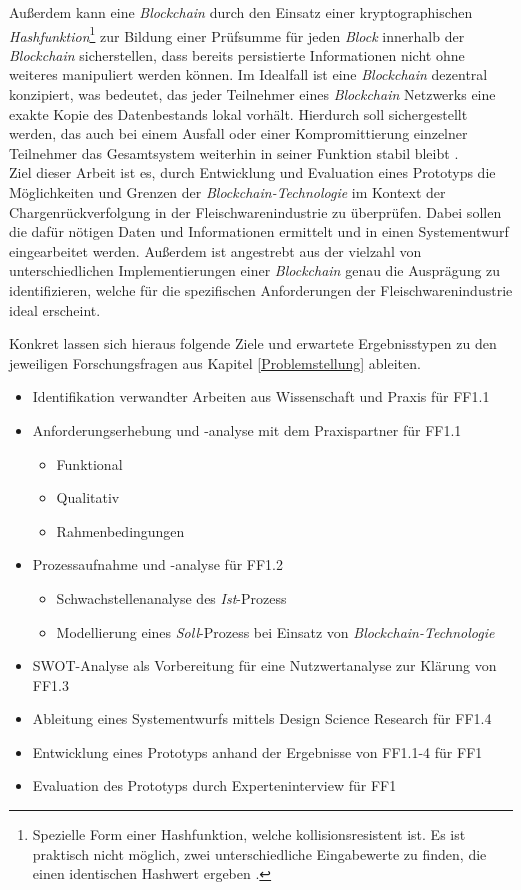 Außerdem kann eine \textit{Blockchain} durch den Einsatz einer kryptographischen \textit{Hashfunktion}\footnote{Spezielle Form einer Hashfunktion, welche kollisionsresistent ist. Es ist praktisch nicht möglich, zwei unterschiedliche Eingabewerte zu finden, die einen identischen Hashwert ergeben \citep{Menezes1997}.} zur Bildung einer Prüfsumme für jeden \textit{Block} innerhalb der \textit{Blockchain} sicherstellen, dass bereits persistierte Informationen nicht ohne weiteres manipuliert werden können. Im Idealfall ist eine \textit{Blockchain} dezentral konzipiert, was bedeutet, das jeder Teilnehmer eines \textit{Blockchain} Netzwerks eine exakte Kopie des Datenbestands lokal vorhält. Hierdurch soll sichergestellt werden, das auch bei einem Ausfall oder einer Kompromittierung einzelner Teilnehmer das Gesamtsystem weiterhin in seiner Funktion stabil bleibt \citep{Drescher2017, Tribis2018}.\\

Ziel dieser Arbeit ist es, durch Entwicklung und Evaluation eines Prototyps die Möglichkeiten und Grenzen der \textit{Blockchain-Technologie} im Kontext der Chargenrückverfolgung in der Fleischwarenindustrie zu überprüfen. Dabei sollen die dafür nötigen Daten und Informationen ermittelt und in einen Systementwurf eingearbeitet werden. Außerdem ist angestrebt aus der vielzahl von unterschiedlichen Implementierungen einer \textit{Blockchain} genau die Ausprägung zu identifizieren, welche für die spezifischen Anforderungen der Fleischwarenindustrie ideal erscheint.

Konkret lassen sich hieraus folgende Ziele und erwartete Ergebnisstypen zu den jeweiligen Forschungsfragen aus Kapitel \ref{Problemstellung} ableiten.

\begin{itemize}
  \item Identifikation verwandter Arbeiten aus Wissenschaft und Praxis für FF1.1
  \item Anforderungserhebung und -analyse mit dem Praxispartner für FF1.1
  \begin{itemize}
    \item Funktional
    \item Qualitativ
    \item Rahmenbedingungen
  \end{itemize}
  \item Prozessaufnahme und -analyse für FF1.2
  \begin{itemize}
    \item Schwachstellenanalyse des \textit{Ist}-Prozess
    \item Modellierung eines \textit{Soll}-Prozess bei Einsatz von \textit{Blockchain-Technologie}
  \end{itemize}
  \item SWOT-Analyse als Vorbereitung für eine Nutzwertanalyse zur Klärung von FF1.3
  \item Ableitung eines Systementwurfs mittels Design Science Research für FF1.4
  \item Entwicklung eines Prototyps anhand der Ergebnisse von FF1.1-4 für FF1
  \item Evaluation des Prototyps durch Experteninterview für FF1
\end{itemize}

